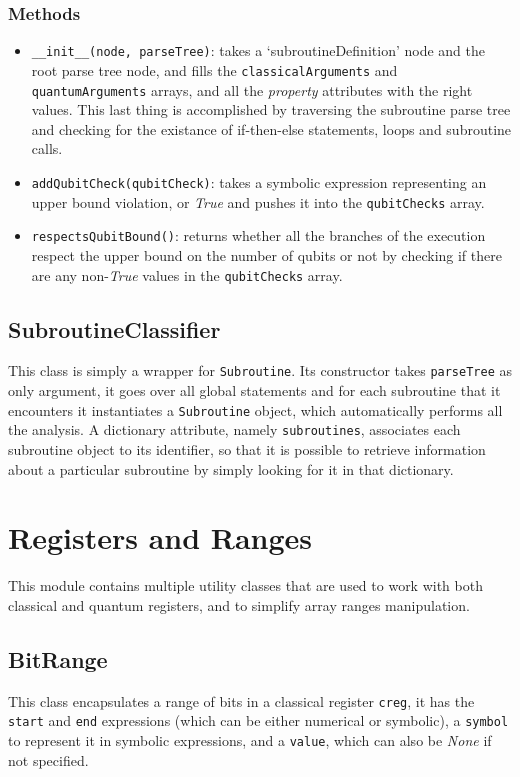\documentclass[12pt,a4paper]{report}
\theoremstyle{definition}
\theoremstyle{definition}
\theoremstyle{definition}
\begin{document}
\subsubsection{Methods}
\begin{itemize}
    \itemsep 0em
    \item \texttt{\_\_init\_\_(node, parseTree)}: takes a `subroutineDefinition' node and the root parse tree node, and fills the \texttt{classicalArguments} and \texttt{quantumArguments} arrays, and all the \textit{property} attributes with the right values. This last thing is accomplished by traversing the subroutine parse tree and checking for the existance of if-then-else statements, loops and subroutine calls.
    \item \texttt{addQubitCheck(qubitCheck)}: takes a symbolic expression representing an upper bound violation, or \textit{True} and pushes it into the \texttt{qubitChecks} array.
    \item \texttt{respectsQubitBound()}: returns whether all the branches of the execution respect the upper bound on the number of qubits or not by checking if there are any non-\textit{True} values in the \texttt{qubitChecks} array.
\end{itemize}

\subsection{SubroutineClassifier}
This class is simply a wrapper for \texttt{Subroutine}. Its constructor takes \texttt{parseTree} as only argument, it goes over all global statements and for each subroutine that it encounters it instantiates a \texttt{Subroutine} object, which automatically performs all the analysis. A dictionary attribute, namely \texttt{subroutines}, associates each subroutine object to its identifier, so that it is possible to retrieve information about a particular subroutine by simply looking for it in that dictionary.

\section{Registers and Ranges}
This module contains multiple utility classes that are used to work with both classical and quantum registers, and to simplify array ranges manipulation.


\subsection{BitRange}
This class encapsulates a range of bits in a classical register \texttt{creg}, it has the \texttt{start} and \texttt{end} expressions (which can be either numerical or symbolic), a \texttt{symbol} to represent it in symbolic expressions, and a \texttt{value}, which can also be \textit{None} if not specified.
\end{document}
